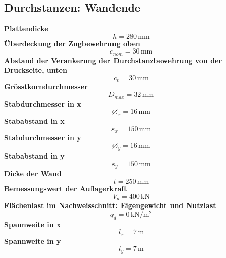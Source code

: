 \documentclass[11pt,a4paper]{article}
\begin{document}
\subsection{Durchstanzen: Wandende}
\noindent\textbf{Plattendicke}
\begin{equation*}
h = 280\,\mathrm{mm}
\end{equation*}
\noindent\textbf{Überdeckung der Zugbewehrung oben}
\begin{equation*}
c_{nom} = 30\,\mathrm{mm}
\end{equation*}
\noindent\textbf{Abstand der Verankerung der Durchstanzbewehrung von der Druckseite, unten}
\begin{equation*}
c_v = 30\,\mathrm{mm}
\end{equation*}
\noindent\textbf{Grösstkorndurchmesser}
\begin{equation*}
D_{max} = 32\,\mathrm{mm}
\end{equation*}
\noindent\textbf{Stabdurchmesser in x}
\begin{equation*}
\varnothing_x = 16\,\mathrm{mm}
\end{equation*}
\noindent\textbf{Stababstand in x}
\begin{equation*}
s_x = 150\,\mathrm{mm}
\end{equation*}
\noindent\textbf{Stabdurchmesser in y}
\begin{equation*}
\varnothing_y = 16\,\mathrm{mm}
\end{equation*}
\noindent\textbf{Stababstand in y}
\begin{equation*}
s_y = 150\,\mathrm{mm}
\end{equation*}
\noindent\textbf{Dicke der Wand}
\begin{equation*}
t = 250\,\mathrm{mm}
\end{equation*}
\noindent\textbf{Bemessungswert der Auflagerkraft}
\begin{equation*}
V_d = 400\,\mathrm{kN}
\end{equation*}
\noindent\textbf{Flächenlast im Nachweisschnitt: Eigengewicht und Nutzlast}
\begin{equation*}
q_d = 0\,\mathrm{kN}/\mathrm{m}^{2}
\end{equation*}
\noindent\textbf{Spannweite in x}
\begin{equation*}
l_x = 7\,\mathrm{m}
\end{equation*}
\noindent\textbf{Spannweite in y}
\begin{equation*}
l_y = 7\,\mathrm{m}
\end{equation*}
\end{document}
